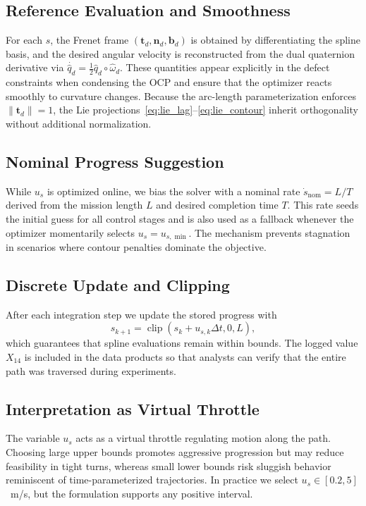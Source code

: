 \documentclass[letterpaper, 10pt, conference]{IEEEtran}
\newcommand{\dq}{\hat{q}}
\newcommand{\dqD}{\dq_d}
\begin{document}
\subsection{Reference Evaluation and Smoothness}
For each $s$, the Frenet frame $(\mathbf{t}_d, \mathbf{n}_d, \mathbf{b}_d)$ is obtained by differentiating the spline basis, and the desired angular velocity is reconstructed from the dual quaternion derivative via $\dot{\dqD} = \tfrac{1}{2} \dqD \circ \hat{\omega}_d$. These quantities appear explicitly in the defect constraints when condensing the OCP and ensure that the optimizer reacts smoothly to curvature changes. Because the arc-length parameterization enforces $\|\mathbf{t}_d\|=1$, the Lie projections~\eqref{eq:lie_lag}--\eqref{eq:lie_contour} inherit orthogonality without additional normalization.

\subsection{Nominal Progress Suggestion}
While $u_s$ is optimized online, we bias the solver with a nominal rate $\dot{s}_\mathrm{nom} = L/T$ derived from the mission length $L$ and desired completion time $T$. This rate seeds the initial guess for all control stages and is also used as a fallback whenever the optimizer momentarily selects $u_s = u_{s,\min}$. The mechanism prevents stagnation in scenarios where contour penalties dominate the objective.

\subsection{Discrete Update and Clipping}
After each integration step we update the stored progress with
\begin{equation}
    s_{k+1} = \operatorname{clip}(s_k + u_{s,k} \Delta t, 0, L),
\end{equation}
which guarantees that spline evaluations remain within bounds. The logged value $X_{14}$ is included in the data products so that analysts can verify that the entire path was traversed during experiments.

\subsection{Interpretation as Virtual Throttle}
The variable $u_s$ acts as a virtual throttle regulating motion along the path. Choosing large upper bounds promotes aggressive progression but may reduce feasibility in tight turns, whereas small lower bounds risk sluggish behavior reminiscent of time-parameterized trajectories. In practice we select $u_s \in [0.2, 5]$~m/s, but the formulation supports any positive interval.
\end{document}
